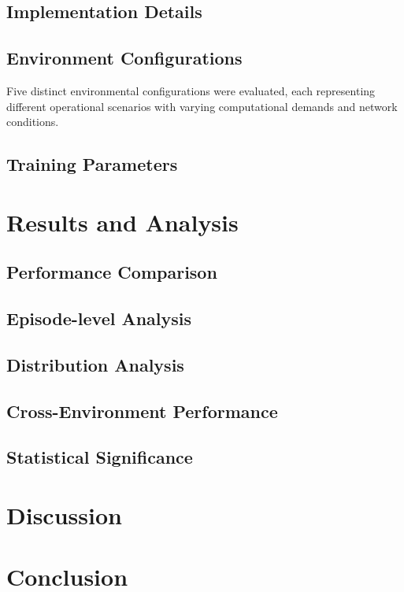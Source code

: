 \documentclass[journal]{IEEEtran}
\begin{document}
\subsection{Implementation Details}

\subsection{Environment Configurations}
Five distinct environmental configurations were evaluated, each representing different operational scenarios with varying computational demands and network conditions.

\subsection{Training Parameters}

\section{Results and Analysis}
\label{sec:results}

\subsection{Performance Comparison}

\subsection{Episode-level Analysis}

\subsection{Distribution Analysis}

\subsection{Cross-Environment Performance}

\subsection{Statistical Significance}

\section{Discussion}
\label{sec:discussion}


\section{Conclusion}
\label{sec:conclusion}




\end{document}
